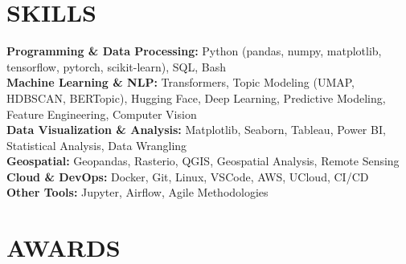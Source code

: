 \documentclass{resume}
\begin{document}
\section{SKILLS} 
\begin{content}
    {\bf Programming \& Data Processing:} Python {\footnotesize (pandas, numpy, matplotlib, tensorflow, pytorch, scikit-learn)}, SQL, Bash \\
    {\bf Machine Learning \& NLP:} Transformers, Topic Modeling {\footnotesize (UMAP, HDBSCAN, BERTopic)}, Hugging Face, Deep Learning, Predictive Modeling, Feature Engineering, Computer Vision \\
    {\bf Data Visualization \& Analysis:} Matplotlib, Seaborn, Tableau, Power BI, Statistical Analysis, Data Wrangling \\
    {\bf Geospatial:} Geopandas, Rasterio, QGIS, Geospatial Analysis, Remote Sensing \\
    {\bf Cloud \& DevOps:} Docker, Git, Linux, VSCode, AWS, UCloud, CI/CD \\
    {\bf Other Tools:} Jupyter, Airflow, Agile Methodologies
\end{content}


\section{AWARDS}
\begin{content}
     \\
     \\
\end{content}

\end{document}
